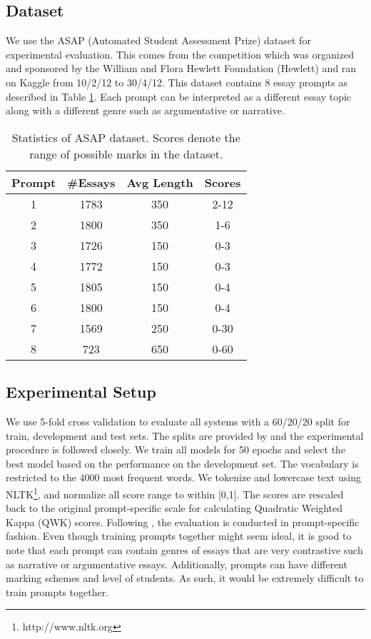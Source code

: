 \documentclass[letterpaper]{article}
\begin{document}
\subsection{Dataset}
We use the ASAP (Automated Student Assessment Prize) dataset for experimental evaluation. This comes from the competition which was organized and sponsored by the William and Flora Hewlett Foundation (Hewlett) and ran on Kaggle from 10/2/12 to 30/4/12. This dataset contains 8 essay prompts as described in Table \ref{tab:asap}. Each prompt can be interpreted as a different essay topic along with a different genre such as argumentative or narrative. 
\begin{table}[htbp]
   \centering
\small
     \begin{tabular}{|c|c|c|c|}
     \hline
     Prompt & \#Essays & Avg Length & Scores \\
     \hline
     1     & 1783  & 350   & 2-12 \\
     2     & 1800  & 350   &  1-6 \\
     3     & 1726  & 150   &  0-3 \\
     4     & 1772  & 150   &  0-3 \\
     5     & 1805  & 150   &  0-4\\
     6     & 1800  & 150   &  0-4\\
     7     & 1569  & 250   &  0-30\\
     8     & 723   & 650   &  0-60\\
     \hline
     \end{tabular}\caption{Statistics of ASAP dataset. Scores denote the range of possible marks in the dataset. }
   \label{tab:asap}\end{table}

\subsection{Experimental Setup}
 We use 5-fold cross validation to evaluate all systems with a 60/20/20 split for train, development and test sets. The splits are provided by \cite{DBLP:conf/emnlp/TaghipourN16} and the experimental procedure is followed closely. We train all models for 50 epochs and select the best model based on the performance on the development set. The vocabulary is restricted to the $4000$ most frequent words.  We tokenize and lowercase text using NLTK\footnote{http://www.nltk.org}, and normalize all score range to within [0,1]. The scores are rescaled back to the original prompt-specific scale for calculating Quadratic Weighted Kappa (QWK) scores. Following \cite{DBLP:conf/emnlp/TaghipourN16}, the evaluation is conducted in prompt-specific fashion. Even though training prompts together might seem ideal, it is good to note that each prompt can contain genres of essays that are very contrastive such as narrative or argumentative essays. Additionally, prompts can have different marking schemes and level of students. As such, it would be extremely difficult to train prompts together. 
\end{document}
